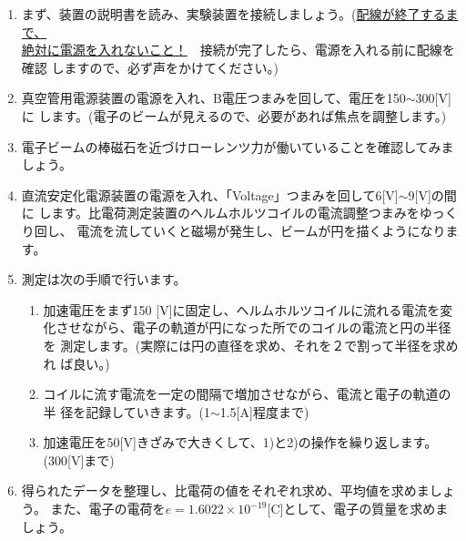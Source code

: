 \begin{enumerate}

\item まず、装置の説明書を読み、実験装置を接続しましょう。(\underline{配線が終了するまで、} \\
\underline{絶対に電源を入れないこと！}　接続が完了したら、電源を入れる前に配線を確認 
しますので、必ず声をかけてください。)

\item 真空管用電源装置の電源を入れ、B電圧つまみを回して、電圧を150$\sim$300[V]に 
します。(電子のビームが見えるので、必要があれば焦点を調整します。)

\item 電子ビームの棒磁石を近づけローレンツ力が働いていることを確認してみましょう。

\item 直流安定化電源装置の電源を入れ、「Voltage」つまみを回して6[V]$\sim$9[V]の間に 
します。比電荷測定装置のヘルムホルツコイルの電流調整つまみをゆっくり回し、 
電流を流していくと磁場が発生し、ビームが円を描くようになります。


\item 測定は次の手順で行います。

\begin{enumerate}

\item 加速電圧をまず150 [V]に固定し、ヘルムホルツコイルに流れる電流を変 
化させながら、電子の軌道が円になった所でのコイルの電流と円の半径を 
測定します。(実際には円の直径を求め、それを２で割って半径を求めれ 
ば良い。)

\item コイルに流す電流を一定の間隔で増加させながら、電流と電子の軌道の半 
径を記録していきます。(1$\sim$1.5[A]程度まで)

\item 加速電圧を50[V]きざみで大きくして、1)と2)の操作を繰り返します。 
(300[V]まで)

\end{enumerate}

\item 得られたデータを整理し、比電荷の値をそれぞれ求め、平均値を求めましょう。 
また、電子の電荷を$e=1.6022\times 10^{-19}$[C]として、電子の質量を求めましょう。


\end{enumerate}
